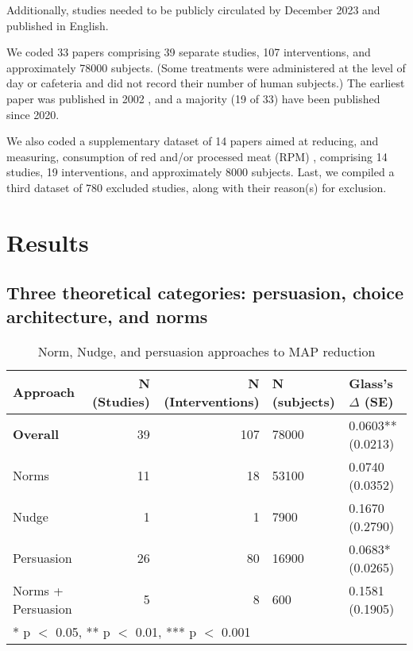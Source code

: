 \documentclass[sn-nature,pdflatex]{sn-jnl}
\begin{document}
Additionally, studies needed to be publicly circulated by December 2023
and published in English.

We coded 33 papers
\citep{abrahamse2007, alblas2023, aldoh2023, allen2002, andersson2021, acharya2004, berndsen2005, bertolaso2015, bianchi2022, bochmann2017, bschaden2020, carfora2023, coker2022, cooney2016, fehrenbach2015, feltz2022, griesoph2021, haile2021, hatami2018, hennessy2016, jalil2023, lacroix2020, mathur2021effectiveness, mattson2020, merrill2009, norris2014, peacock2017, piester2020, polanco2022, sparkman2017, sparkman2020, sparkman2021, weingarten2022}
comprising 39 separate studies, 107 interventions, and approximately
78000 subjects. (Some treatments were administered at the level of day
or cafeteria and did not record their number of human subjects.) The
earliest paper was published in 2002 \citep{allen2002}, and a majority
(19 of 33) have been published since 2020.

We also coded a supplementary dataset of 14 papers aimed at reducing,
and measuring, consumption of red and/or processed meat (RPM)
\citep{carfora2017correlational, carfora2017randomised, carfora2019, carfora2019informational, delichatsios2001, dijkstra2022, emmons2005cancer, emmons2005project, jaacks2014, james2015, lee2018, perino2022, schatzkin2000, sorensen2005},
comprising 14 studies, 19 interventions, and approximately 8000
subjects. Last, we compiled a third dataset of 780 excluded studies,
along with their reason(s) for exclusion.

\section{Results}\label{sec2}

\subsection{Three theoretical categories: persuasion, choice
architecture, and norms}\label{sec2.1}

\begin{table}[!h]
\centering
\caption{\label{tab:tab:table_one}Norm, Nudge, and persuasion approaches to MAP reduction}
\centering
\begin{tabular}[t]{lrrll}
\toprule
Approach & N (Studies) & N (Interventions) & N (subjects) & Glass's $\Delta$ (SE)\\
\midrule
\textbf{Overall} & 39 & 107 & 78000 & 0.0603** (0.0213)\\
Norms & 11 & 18 & 53100 & 0.0740 (0.0352)\\
Nudge & 1 & 1 & 7900 & 0.1670 (0.2790)\\
Persuasion & 26 & 80 & 16900 & 0.0683* (0.0265)\\
Norms + Persuasion & 5 & 8 & 600 & 0.1581 (0.1905)\\
\bottomrule
\multicolumn{5}{l}{\rule{0pt}{1em}* p $<$ 0.05, ** p $<$ 0.01, *** p $<$ 0.001}\\
\end{tabular}
\end{table}
\end{document}
